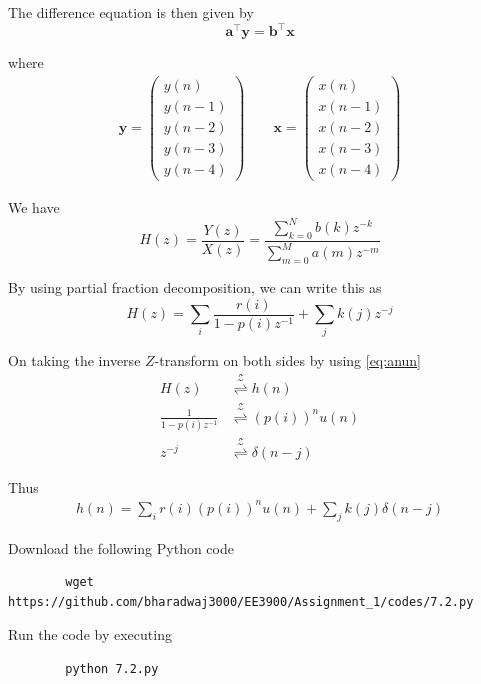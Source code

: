 \documentclass[journal,12pt,twocolumn]{IEEEtran}
\providecommand{\brak}[1]{\ensuremath{\left(#1\right)}}
\providecommand{\ztrans}{\overset{\mathcal{Z}}{ \rightleftharpoons}}
\let\vec\mathbf
\numberwithin{equation}{section}
\renewcommand\thesection{\arabic{section}}
\newcommand{\myvec}[1]{\ensuremath{\begin{pmatrix}#1\end{pmatrix}}}
\begin{document}
\begin{enumerate}[label=\thesection.\arabic*]
	The difference equation is then given by
	\begin{equation}
		\vec{a}^\top \vec{y} = \vec{b}^\top \vec{x} 
	\end{equation}
	
	where
	\begin{align}
		\vec{y} = \myvec{y(n) \\ y(n-1) \\ y(n-2) \\ y(n-3) \\ y(n-4)} \qquad
		\vec{x} = \myvec{x(n) \\ x(n-1) \\ x(n-2) \\ x(n-3) \\ x(n-4)}
	\end{align}
	
	We have
	\begin{equation}
		H(z) = \frac{Y(z)}{X(z)} = \frac{\sum _{k=0}^{N}b\brak{k} z^{-k}}{\sum _{m=0}^{M}a\brak{m} z^{-m}}
	\end{equation}
	
	By using partial fraction decomposition, we can write this as
	\begin{equation}
		H(z) = \sum_i \frac{r(i)}{1-p(i)z^{-1}} + \sum_j k(j)z^{-j}
	\end{equation}
	
	On taking the inverse $Z$-transform on both sides by using \eqref{eq:anun}
	\begin{align}
		H(z) &\ztrans h(n) \\
		\frac{1}{1-p(i)z^{-1}} &\ztrans \brak{p(i)}^nu(n) \\
		z^{-j} &\ztrans \delta(n-j) 
	\end{align}
	
	Thus
	\begin{align}
		h(n) = \sum_i r(i)\brak{p(i)}^nu(n) + \sum_j k(j)\delta(n-j)
	\end{align}
	
	Download the following Python code
	\begin{lstlisting}
		wget https://github.com/bharadwaj3000/EE3900/Assignment_1/codes/7.2.py
	\end{lstlisting}
	
	Run the code by executing
	\begin{lstlisting}
		python 7.2.py
	\end{lstlisting}
	

\end{enumerate}
\end{document}

